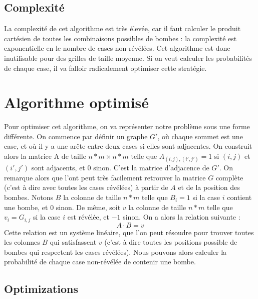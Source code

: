 \subsection{Complexité}

La complexité de cet algorithme est très élevée, car il faut calculer le produit cartésien de toutes les combinaisons possibles de bombes : la complexité est exponentielle en le nombre de cases non-révélées.
Cet algorithme est donc inutilisable pour des grilles de taille moyenne.
\newline
Si on veut calculer les probabilités de chaque case, il va falloir radicalement optimiser cette stratégie.

\section{Algorithme optimisé}

Pour optimiser cet algorithme, on va représenter notre problème sous une forme différente. 
\newline
On commence par définir un graphe $G'$, où chaque sommet est une case, et où il y a une arête entre deux cases si elles sont adjacentes.
On construit alors la matrice A de taille $n*m \times n*m$ telle que $A_{(i, j), (i', j')} = 1$ si ${(i, j)}$ et ${(i', j')}$ sont adjacents, et $0$ sinon. C'est la matrice d'adjacence de $G'$.
\newline
On remarque alors que l'ont peut très facilement retrouver la matrice $G$ complète (c'est à dire avec toutes les cases révélées) à partir de $A$ et de la position des bombes.
\newline
\newline
Notons $B$ la colonne de taille $n*m$ telle que $B_i = 1$ si la case $i$ contient une bombe, et $0$ sinon.
De même, soit $v$ la colonne de taille $n*m$ telle que $v_i = G_{i,j}$ si la case $i$ est révélée, et $-1$ sinon.
\newline
\newline
On a alors la relation suivante :
\[
A \cdot B = v
\]
\newline
Cette relation est un système linéaire, que l'on peut résoudre pour trouver toutes les colonnes $B$ qui satisfassent $v$ (c'est à dire toutes les positions possible de bombes qui respectent les cases révélées).
Nous pouvons alors calculer la probabilité de chaque case non-révélée de contenir une bombe.

\subsection{Optimizations}

